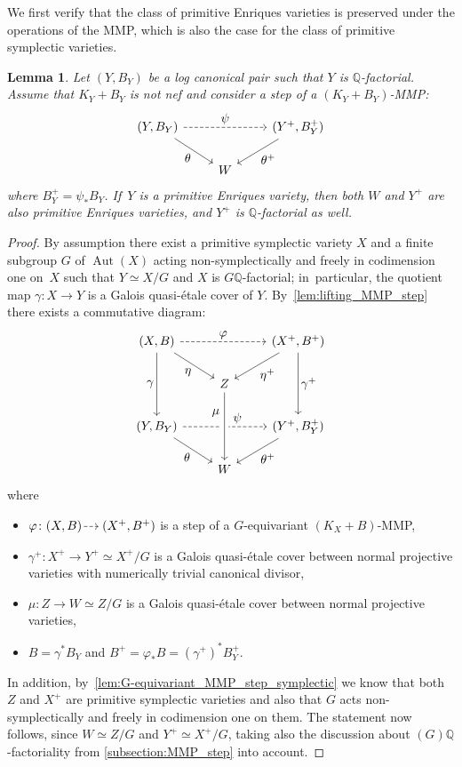 \documentclass[JEP,XML,SOM,Unicode,published]{cedram}
\let\ts\textstyle
\newcommand{\dradpl}{{\hspace*{-2.5mm}\begin{tikzcd}[ampersand replacement=\&,column sep = scriptsize]\mbox{}\ar[r,dashed]\&\mbox{}\end{tikzcd}\hspace*{-2.5mm}}}
\newcommand{\dratst}{{\hspace*{-2.5mm}\begin{tikzcd}[ampersand replacement=\&,column sep = small]\mbox{}\ar[r,dashed]\&\mbox{}\end{tikzcd}\hspace*{-2mm}}}
\let\drascst\dratst
\newcommand{\dra}{\mathchoice{\dradpl}{\dratst}{\drascst}{\drascst}}
\theoremstyle{plain}
\newtheorem{lem}[thm]{Lemma}
\theoremstyle{definition}
\newcommand{\Q}{\mathbb{Q}}
\DeclareMathOperator{\Aut}{Aut}
\begin{document}
We first verify that the class of primitive Enriques varieties is preserved under the operations of the MMP,
which is also the case for the class of primitive symplectic varieties.

\begin{lem}
\label{lem:MMP_step_primitive_Enriques}
Let $(Y,B_Y)$ be a log canonical pair such that $Y$ is $\Q$\nobreakdash-factorial. Assume that $K_Y + B_Y$ is not nef and consider a step of a $(K_Y + B_Y)$-MMP:
\[
\begin{tikzcd}
(Y, B_Y) \arrow[dr, "\ts \theta" swap] \arrow[rr, "\ts \psi", dashed] && (Y^+, B_Y^+) \arrow[dl, "\ts \theta^+"] \\
& W
\end{tikzcd}
\]
where $B_Y^+ = \psi_* B_Y$. If~$Y$ is a primitive Enriques variety, then both $W$ and $Y^+$ are also primitive Enriques varieties, and $Y^+$ is $\Q$\nobreakdash-factorial as well.
\end{lem}

\begin{proof}
By assumption there exist a primitive symplectic variety $X$ and a finite subgroup $G$ of $\Aut(X)$ acting non-symplectically and freely in codimension one on~$X$ such that $Y \simeq X / G$ and $X$ is $G\Q$-factorial; in~particular, the quotient map $\gamma \colon X \to Y$ is a Galois quasi-étale cover of $Y$. By~\autoref{lem:lifting_MMP_step} there exists a commutative diagram:
\[
\begin{tikzcd}
(X, B) \arrow[dd, "\ts \gamma" swap] \arrow[rr, "\ts \varphi", dashed] \arrow[dr, "\ts \eta" swap] && (X^+, B^+) \arrow[dl, "\ts \eta^+"] \arrow[dd, "\ts \gamma^+"] \\
& Z \arrow[dd, "\ts \mu\,", pos=0.3, swap] \\
(Y,B_Y) \arrow[rr, "\ts \psi", pos=0.65, dashed] \arrow[dr, "\ts \theta" swap] && (Y^+,B_Y^+) \arrow[dl, "\ts \theta^+"] \\
& W\arrow[uu, leftarrow, crossing over]
\end{tikzcd}
\]
where
\begin{itemize}
\item
$\varphi \colon (X,B) \dra (X^+, B^+)$ is a step of a $G$\nobreakdash-equivariant $(K_X+B)$-MMP,

\item
$\gamma^+ \colon X^+ \to Y^+ \simeq X^+ / G$ is a Galois quasi-étale cover between normal projective varieties with numerically trivial canonical divisor,

\item
$\mu \colon Z \to W \simeq Z / G$ is a Galois quasi-étale cover between normal projective varieties,

\item
$B = \gamma^* B_Y$ and $B^+ = \varphi_* B = (\gamma^+)^* B_Y^+$.
\end{itemize}
In addition, by~\autoref{lem:G-equivariant_MMP_step_symplectic} we know that both $Z$ and $X^+$ are primitive symplectic varieties and also that $G$ acts non-symplectically and freely in codimension one on them. The statement now follows, since $W \simeq Z / G$ and $Y^+ \simeq X^+ / G$, taking also the discussion about $(G)\Q$-factoriality from \autoref{subsection:MMP_step} into account.
\end{proof}
\end{document}
